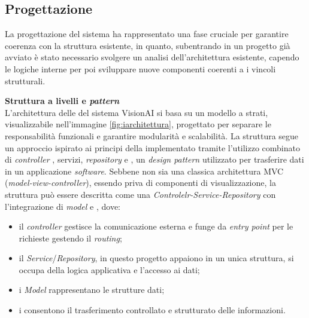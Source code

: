 \subsection{Progettazione}
La progettazione del sistema ha rappresentato una fase cruciale per garantire coerenza con la struttura esistente, in quanto, subentrando in un progetto già avviato è stato necessario svolgere un analisi dell'architettura esistente, capendo le logiche interne per poi sviluppare nuove componenti coerenti a i vincoli strutturali.

\textbf{Struttura a livelli e \textit{pattern}} \\
L'architettura delle  del sistema VisionAI si basa su un modello a strati, visualizzabile nell'immagine \ref{fig:iarchitettura}, progettato per separare le responsabilità funzionali e garantire modularità e scalabilità. La struttura segue un approccio ispirato ai principi della  implementato tramite l'utilizzo combinato di \textit{controller} , servizi, \textit{repository} e , un \textit{design pattern} utilizzato per trasferire dati in un applicazione \textit{software}.
Sebbene non sia una classica architettura MVC (\textit{model-view-controller}), essendo priva di componenti di visualizzazione, la struttura può essere descritta come una \textit{Controlelr-Service-Repository} con l'integrazione di \textit{model} e , dove:
\begin{itemize}
    \item il \textit{controller} gestisce la comunicazione esterna e funge da \textit{entry point} per le richieste  gestendo il \textit{routing};
    \item il \textit{Service}/\textit{Repository}, in questo progetto appaiono in un unica struttura, si occupa della logica applicativa e l'accesso ai dati;
    \item i \textit{Model} rappresentano le strutture dati;
    \item i  consentono il trasferimento controllato e strutturato delle informazioni.
\end{itemize}

